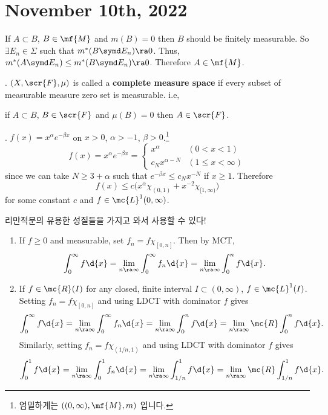 \section*{November 10th, 2022}

\rmk If \(A \subset B\), \(B \in \mf{M}\) and \(m(B) = 0\) then \(B\) should be finitely measurable. So \(\exists E_n \in \Sigma\) such that \(m^\ast(B\symd E_n) \ra 0\). Thus, \(m^\ast(A \symd E_n) \leq m^\ast(B\symd E_n) \ra 0\). Therefore \(A \in \mf{M}\).

.  \((X, \scr{F}, \mu)\) is called a \textbf{complete measure space} if every subset of measurable measure zero set is measurable. i.e,
\begin{center}
    if \(A \subset B\), \(B \in \scr{F}\) and \(\mu(B) = 0\) then \(A \in \scr{F}\).
\end{center}

\ex. \(f(x) = x^{\alpha} e^{-\beta x}\) on \(x > 0\), \(\alpha > - 1\), \(\beta > 0\).\footnote{엄밀하게는 \(((0, \infty), \mf{M}, m)\) 입니다.}
\[
    f(x) = x^\alpha e^{-\beta x} = \begin{cases}
        x^\alpha & (0 < x < 1) \\ c_N x^{\alpha - N} & (1 \leq x < \infty)
    \end{cases}
\]
since we can take \(N \geq 3 + \alpha\) such that \(e^{-\beta x} \leq c_N x^{-N}\) if \(x \geq 1\). Therefore
\[
    f(x) \leq c\bigl(x^\alpha \chi_{(0, 1)} + x^{-2} \chi_{[1, \infty)}\bigr)
\]
for some constant \(c\) and \(f \in \mc{L}^{1}(0, \infty)\).

\rmk 리만적분의 유용한 성질들을 가지고 와서 사용할 수 있다!
\begin{enumerate}
    \item If \(f \geq 0\) and measurable, set \(f_n = f\chi_{[0, n]}\). Then by MCT,
          \[
              \int_0^\infty f \d{x} = \lim_{n \ra \infty} \int_0^\infty f_n \d{x} = \lim_{n \ra \infty} \int_0^n f \d{x}.
          \]
    \item If \(f \in \mc{R}(I)\) for any closed, finite interval \(I \subset (0, \infty)\), \(f \in \mc{L}^{1}(I)\). Setting \(f_n = f\chi_{[0, n]}\) and using LDCT with dominator \(f\) gives
          \[
              \int_0^\infty f \d{x} = \lim_{n \ra \infty} \int_0^\infty f_n \d{x} = \lim_{n \ra \infty} \int_0^n f \d{x} = \lim_{n \ra \infty} \mc{R} \int_0^n f \d{x}.
          \]
          Similarly, setting \(f_n = f\chi_{(1/n, 1)}\) and using LDCT with dominator \(f\) gives
          \[
              \int_0^1 f\d{x} = \lim_{n \ra \infty} \int_{0}^1 f_n \d{x} = \lim_{n \ra \infty}\int_{1/n}^1 f \d{x} = \lim_{n \ra \infty} \mc{R}\int_{1/n}^1 f \d{x}.
          \]
\end{enumerate}

